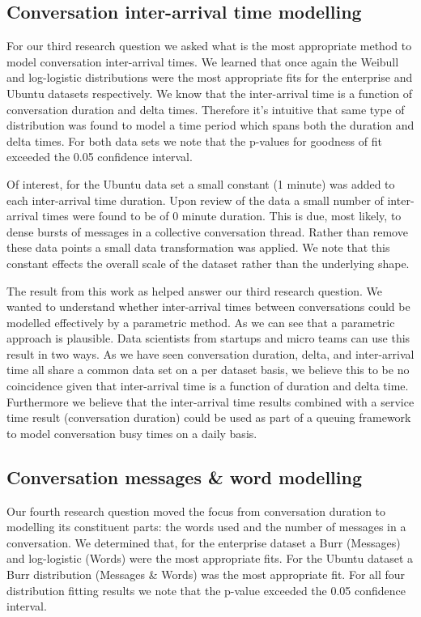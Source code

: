 \subsection{Conversation inter-arrival time modelling}

For our third research question we asked what is the most appropriate method to model conversation inter-arrival times. We learned that once again the Weibull and log-logistic distributions were the most appropriate fits for the enterprise and Ubuntu datasets respectively. We know that the inter-arrival time is a function of conversation duration and delta times. Therefore it's intuitive that same type of distribution was found to model a time period which spans both the duration and delta times. For both data sets we note that the p-values for goodness of fit exceeded the 0.05 confidence interval.

Of interest, for the Ubuntu data set a small constant (1 minute) was added to each inter-arrival time duration. Upon review of the data a small number of inter-arrival times were found to be of 0 minute duration. This is due, most likely, to dense bursts of messages in a collective conversation thread. Rather than remove these data points a small data transformation was applied. We note that this constant effects the overall scale of the dataset rather than the underlying shape.

The result from this work as helped answer our third research question. We wanted to understand whether inter-arrival times between conversations could be modelled effectively by a parametric method. As we can see that a parametric approach is plausible. Data scientists from startups and micro teams can use this result in two ways. As we have seen conversation duration, delta, and inter-arrival time all share a common data set on a per dataset basis, we believe this to be no coincidence given that inter-arrival time is a function of duration and delta time. Furthermore we believe that the inter-arrival time results combined with a service time result (conversation duration) could be used as part of a queuing framework to model conversation busy times on a daily basis.

\subsection{Conversation messages \& word modelling}

Our fourth research question moved the focus from conversation duration to modelling its constituent parts: the words used and the number of messages in a conversation. We determined that, for the enterprise dataset a Burr (Messages) and log-logistic (Words) were the most appropriate fits. For the Ubuntu dataset a Burr distribution (Messages \& Words) was the most appropriate fit. For all four distribution fitting results we note that the p-value exceeded the 0.05 confidence interval.  

